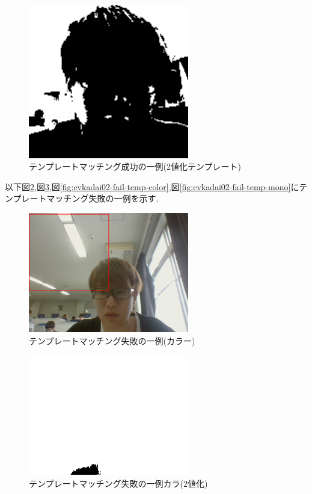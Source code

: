 \documentclass{jarticle}
\begin{document}
\begin{figure}[H]
\begin{center}
\includegraphics[width=7.0cm]{cv_kadai02/success-temp-mono.png}
\caption{テンプレートマッチング成功の一例(2値化テンプレート)}
\label{fig:cvkadai02-success-temp-mono}
\end{center}
\end{figure}


以下図\ref{fig:cvkadai02-fail-color},図\ref{fig:cvkadai02-fail-mono},図\ref{fig:cvkadai02-fail-temp-color},図\ref{fig:cvkadai02-fail-temp-mono}にテンプレートマッチング失敗の一例を示す.


\begin{figure}[H]
\begin{center}
\includegraphics[width=7.0cm]{cv_kadai02/fail-color.png}
\caption{テンプレートマッチング失敗の一例(カラー)}
\label{fig:cvkadai02-fail-color}
\end{center}
\end{figure}

\begin{figure}[H]
\begin{center}
\includegraphics[width=7.0cm]{cv_kadai02/fail-mono.png}
\caption{テンプレートマッチング失敗の一例カラ(2値化)}
\label{fig:cvkadai02-fail-mono}
\end{center}
\end{figure}
\end{document}
